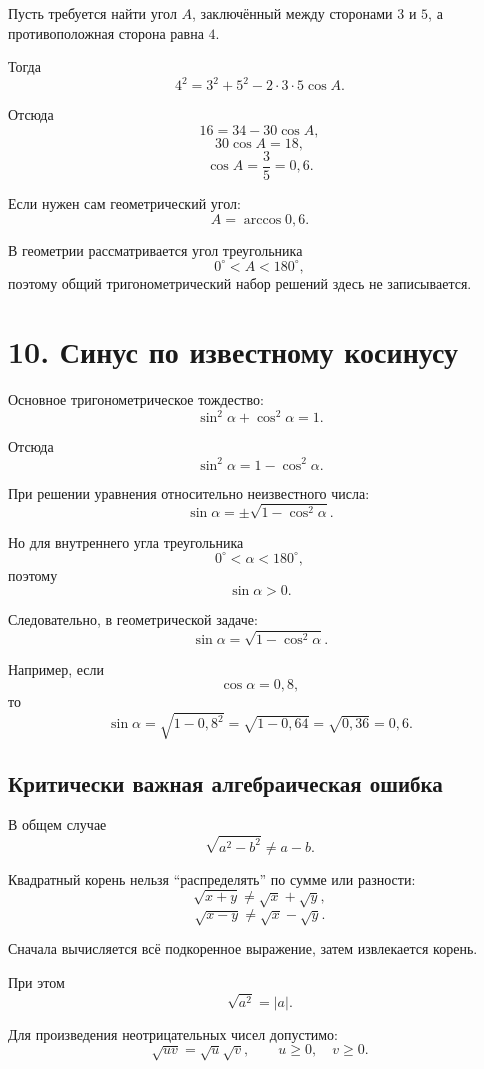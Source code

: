\documentclass[a4paper,12pt]{article}
\begin{document}
Пусть требуется найти угол \(A\), заключённый между сторонами \(3\) и \(5\), а противоположная сторона равна \(4\).

Тогда
\[
4^2
=
3^2+5^2-2\cdot3\cdot5\cos A.
\]

Отсюда
\[
16=34-30\cos A,
\]
\[
30\cos A=18,
\]
\[
\boxed{\cos A=\frac35=0{,}6}.
\]

Если нужен сам геометрический угол:
\[
\boxed{
A=\arccos 0{,}6.
}
\]

В геометрии рассматривается угол треугольника
\[
0^\circ<A<180^\circ,
\]
поэтому общий тригонометрический набор решений здесь не записывается.


\newpage
\section*{\textcolor{darkaccent}{10. Синус по известному косинусу}}

Основное тригонометрическое тождество:
\[
\boxed{
\sin^2\alpha+\cos^2\alpha=1.
}
\]

Отсюда
\[
\sin^2\alpha=1-\cos^2\alpha.
\]

При решении уравнения относительно неизвестного числа:
\[
\sin\alpha
=
\pm\sqrt{1-\cos^2\alpha}.
\]

Но для внутреннего угла треугольника
\[
0^\circ<\alpha<180^\circ,
\]
поэтому
\[
\sin\alpha>0.
\]

Следовательно, в геометрической задаче:
\[
\boxed{
\sin\alpha
=
\sqrt{1-\cos^2\alpha}.
}
\]

Например, если
\[
\cos\alpha=0{,}8,
\]
то
\[
\sin\alpha
=
\sqrt{1-0{,}8^2}
=
\sqrt{1-0{,}64}
=
\sqrt{0{,}36}
=
0{,}6.
\]

\subsection*{Критически важная алгебраическая ошибка}

В общем случае
\[
\boxed{
\sqrt{a^2-b^2}\ne a-b.
}
\]

Квадратный корень нельзя ``распределять'' по сумме или разности:
\[
\sqrt{x+y}\ne\sqrt{x}+\sqrt{y},
\]
\[
\sqrt{x-y}\ne\sqrt{x}-\sqrt{y}.
\]

Сначала вычисляется всё подкоренное выражение, затем извлекается корень.

При этом
\[
\sqrt{a^2}=|a|.
\]

Для произведения неотрицательных чисел допустимо:
\[
\sqrt{uv}=\sqrt{u}\sqrt{v},
\qquad u\ge0,\quad v\ge0.
\]
\end{document}

